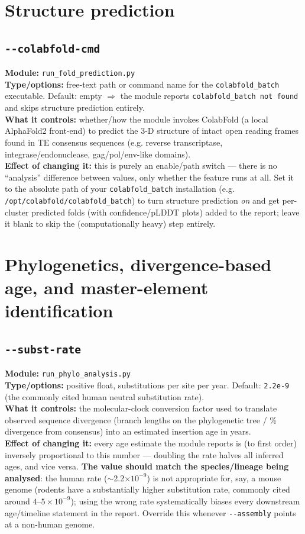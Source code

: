 \documentclass[11pt]{article}
\newcommand{\flag}[1]{\texttt{-\/-#1}}
\newcommand{\param}[1]{\subsection*{\texttt{-\/-#1}}}
\begin{document}
\section{Structure prediction}

\param{colabfold-cmd}
\textbf{Module:} \texttt{run\_fold\_prediction.py}\\
\textbf{Type/options:} free-text path or command name for the \texttt{colabfold\_batch}
executable. Default: empty $\Rightarrow$ the module reports
\texttt{colabfold\_batch not found} and skips structure prediction entirely.\\
\textbf{What it controls:} whether/how the module invokes ColabFold (a local
AlphaFold2 front-end) to predict the 3-D structure of intact open reading frames found
in TE consensus sequences (e.g. reverse transcriptase, integrase/endonuclease,
gag/pol/env-like domains).\\
\textbf{Effect of changing it:} this is purely an enable/path switch — there is no
``analysis'' difference between values, only whether the feature runs at all. Set it to
the absolute path of your \texttt{colabfold\_batch} installation (e.g.
\texttt{/opt/colabfold/colabfold\_batch}) to turn structure prediction \emph{on} and
get per-cluster predicted folds (with confidence/pLDDT plots) added to the report;
leave it blank to skip the (computationally heavy) step entirely.

\section{Phylogenetics, divergence-based age, and master-element identification}

\param{subst-rate}
\textbf{Module:} \texttt{run\_phylo\_analysis.py}\\
\textbf{Type/options:} positive float, substitutions per site per year. Default:
\texttt{2.2e-9} (the commonly cited human neutral substitution rate).\\
\textbf{What it controls:} the molecular-clock conversion factor used to translate
observed sequence divergence (branch lengths on the phylogenetic tree / \% divergence
from consensus) into an estimated insertion age in years.\\
\textbf{Effect of changing it:} every age estimate the module reports is
(to first order) inversely proportional to this number — doubling the rate halves all
inferred ages, and vice versa. \textbf{The value should match the species/lineage being
analysed}: the human rate ($\sim$2.2$\times10^{-9}$) is not appropriate for, say, a
mouse genome (rodents have a substantially higher substitution rate, commonly cited
around $4$--$5\times10^{-9}$); using the wrong rate systematically biases every
downstream age/timeline statement in the report. Override this whenever
\flag{assembly} points at a non-human genome.
\end{document}
